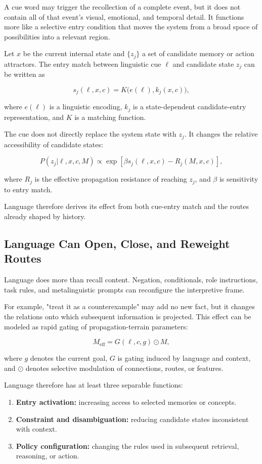 \documentclass[11pt, a4paper]{article}
\begin{document}
A cue word may trigger the recollection of a complete event, but it does not contain all of that event's visual, emotional, and temporal detail. It functions more like a selective entry condition that moves the system from a broad space of possibilities into a relevant region.


Let $x$ be the current internal state and $\{z_j\}$ a set of candidate memory or action attractors. The entry match between linguistic cue $\ell$ and candidate state $z_j$ can be written as


\[
s_j(\ell,x,c)=K\big(e(\ell),k_j(x,c)\big),
\tag{2}
\]

where $e(\ell)$ is a linguistic encoding, $k_j$ is a state-dependent candidate-entry representation, and $K$ is a matching function.


The cue does not directly replace the system state with $z_j$. It changes the relative accessibility of candidate states:


\[
P(z_j|\ell,x,c,M)
\propto
\exp\left[
\beta s_j(\ell,x,c)
-R_j(M,x,c)
\right],
\tag{3}
\]

where $R_j$ is the effective propagation resistance of reaching $z_j$, and $\beta$ is sensitivity to entry match.


Language therefore derives its effect from both cue-entry match and the routes already shaped by history.


\subsection{Language Can Open, Close, and Reweight Routes}


Language does more than recall content. Negation, conditionals, role instructions, task rules, and metalinguistic prompts can reconfigure the interpretive frame.


For example, "treat it as a counterexample" may add no new fact, but it changes the relations onto which subsequent information is projected. This effect can be modeled as rapid gating of propagation-terrain parameters:


\[
M_{\text{eff}}=G(\ell,c,g)\odot M,
\tag{4}
\]

where $g$ denotes the current goal, $G$ is gating induced by language and context, and $\odot$ denotes selective modulation of connections, routes, or features.


Language therefore has at least three separable functions:


\begin{enumerate}
\item \textbf{Entry activation:} increasing access to selected memories or concepts.
\item \textbf{Constraint and disambiguation:} reducing candidate states inconsistent with context.
\item \textbf{Policy configuration:} changing the rules used in subsequent retrieval, reasoning, or action.
\end{enumerate}
\end{document}
